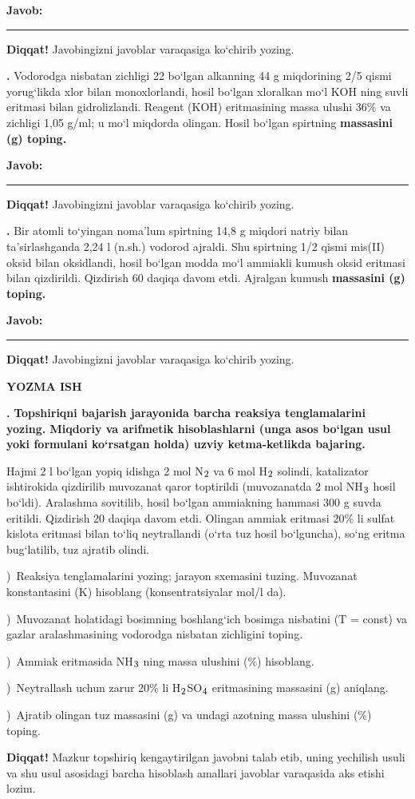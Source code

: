 \documentclass[11pt,a4paper]{article}
\renewcommand{\textsubscript}[1]{\ensuremath{_{\text{\fontsize{8}{8}\selectfont #1}}}}
\newcommand{\qn}[1]{\textbf{\fontsize{11.5}{13}\selectfont #1}}
\newcommand{\qsep}{\par\vspace{13pt}}
\newcommand{\diqqat}[1]{\par\smallskip\noindent\textbf{Diqqat!} #1\par\medskip}
\newcommand{\javob}{\par\nopagebreak[4]\smallskip\noindent\textbf{Javob:} \rule[-2pt]{7.5cm}{0.4pt}\par\smallskip\noindent\textbf{Diqqat!} Javobingizni javoblar varaqasiga ko`chirib yozing.\par\medskip}
\begin{document}
\javob\qsep
\noindent\qn{39.} Vodorodga nisbatan zichligi 22 bo`lgan alkanning 44 g miqdorining 2/5 qismi yorug`likda xlor bilan monoxlorlandi, hosil bo`lgan xloralkan mo`l KOH ning suvli eritmasi bilan gidrolizlandi. Reagent (KOH) eritmasining massa ulushi 36\% va zichligi 1,05 g/ml; u mo`l miqdorda olingan. Hosil bo`lgan spirtning \textbf{massasini (g) toping.}
\javob\qsep
\noindent\qn{40.} Bir atomli to`yingan noma'lum spirtning 14,8 g miqdori natriy bilan ta'sirlashganda 2,24 l (n.sh.) vodorod ajraldi. Shu spirtning 1/2 qismi mis(II) oksid bilan oksidlandi, hosil bo`lgan modda mo`l ammiakli kumush oksid eritmasi bilan qizdirildi. Qizdirish 60 daqiqa davom etdi. Ajralgan kumush \textbf{massasini (g) toping.}
\javob\qsep
\par\bigskip\begin{center}\textbf{\fontsize{13}{15}\selectfont YOZMA ISH}\end{center}
\noindent\qn{41.} \textbf{Topshiriqni bajarish jarayonida barcha reaksiya tenglamalarini yozing. Miqdoriy va arifmetik hisoblashlarni (unga asos bo`lgan usul yoki formulani ko`rsatgan holda) uzviy ketma-ketlikda bajaring.}\par\smallskip
Hajmi 2 l bo`lgan yopiq idishga 2 mol N\textsubscript{2} va 6 mol H\textsubscript{2} solindi, katalizator ishtirokida qizdirilib muvozanat qaror toptirildi (muvozanatda 2 mol NH\textsubscript{3} hosil bo`ldi). Aralashma sovitilib, hosil bo`lgan ammiakning hammasi 300 g suvda eritildi. Qizdirish 20 daqiqa davom etdi. Olingan ammiak eritmasi 20\% li sulfat kislota eritmasi bilan to`liq neytrallandi (o`rta tuz hosil bo`lguncha), so`ng eritma bug`latilib, tuz ajratib olindi.\par
{})\ Reaksiya tenglamalarini yozing; jarayon sxemasini tuzing. Muvozanat konstantasini (K) hisoblang (konsentratsiyalar mol/l da).\par
{})\ Muvozanat holatidagi bosimning boshlang`ich bosimga nisbatini (T = const) va gazlar aralashmasining vodorodga nisbatan zichligini toping.\par
{})\ Ammiak eritmasida NH\textsubscript{3} ning massa ulushini (\%) hisoblang.\par
{})\ Neytrallash uchun zarur 20\% li H\textsubscript{2}SO\textsubscript{4} eritmasining massasini (g) aniqlang.\par
{})\ Ajratib olingan tuz massasini (g) va undagi azotning massa ulushini (\%) toping.\par
\diqqat{Mazkur topshiriq kengaytirilgan javobni talab etib, uning yechilish usuli va shu usul asosidagi barcha hisoblash amallari javoblar varaqasida aks etishi lozim.}\qsep
\end{document}
